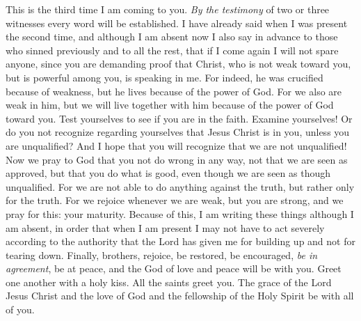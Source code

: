 \begin{biblechapter} %
 This is the third time I am coming to you. \textit{By the testimony} of two or three witnesses every word will be established.
\verse I have already said when I was present the second time, and although I am absent now I also say in advance to those who sinned previously and to all the rest, that if I come again I will not spare anyone,
\verse since you are demanding proof that Christ, who is not weak toward you, but is powerful among you, is speaking in me.
\verse For indeed, he was crucified because of weakness, but he lives because of the power of God. For we also are weak in him, but we will live together with him because of the power of God toward you.
\verse Test yourselves to see if you are in the faith. Examine yourselves! Or do you not recognize regarding yourselves that Jesus Christ is in you, unless you are unqualified?
\verse And I hope that you will recognize that we are not unqualified!
\verse Now we pray to God that you not do wrong in any way, not that we are seen as approved, but that you do what is good, even though we are seen as though unqualified.
\verse For we are not able to do anything against the truth, but rather only for the truth.
\verse For we rejoice whenever we are weak, but you are strong, and we pray for this: your maturity.
\verse Because of this, I am writing these things although I am absent, in order that when I am present I may not have to act severely according to the authority that the Lord has given me for building up and not for tearing down.
 Finally, brothers, rejoice, be restored, be encouraged, \textit{be in agreement}, be at peace, and the God of love and peace will be with you.
\verse Greet one another with a holy kiss. All the saints greet you.
\verse The grace of the Lord Jesus Christ and the love of God and the fellowship of the Holy Spirit be with all of you.
\end{biblechapter}

